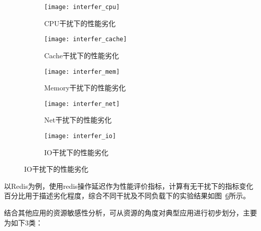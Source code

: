 \begin{figure}[H]
    \centering
    \begin{subfigure}[b]{0.32\textwidth}
        \texttt{[image: interfer\_cpu]}
        \caption{CPU干扰下的性能劣化}
        \label{fig:interfer_cpu}
    \end{subfigure}
    \begin{subfigure}[b]{0.32\textwidth}
      \texttt{[image: interfer\_cache]}
      \caption{Cache干扰下的性能劣化}
      \label{fig:interfer_cache}
    \end{subfigure}
    \begin{subfigure}[b]{0.32\textwidth}
        \texttt{[image: interfer\_mem]}
        \caption{Memory干扰下的性能劣化}
        \label{fig:interfer_mem}
    \end{subfigure}
    \begin{subfigure}[b]{0.32\textwidth}
        \texttt{[image: interfer\_net]}
        \caption{Net干扰下的性能劣化}
        \label{fig:interfer_net}
    \end{subfigure}
    \begin{subfigure}[b]{0.32\textwidth}
        \texttt{[image: interfer\_io]}
        \caption{IO干扰下的性能劣化}
        \label{fig:interfer_io}
    \end{subfigure}

\label{fig:redis_interf_sensitivity}
\end{figure}

以Redis为例，使用redis操作延迟作为性能评价指标，计算有无干扰下的指标变化百分比用于描述劣化程度，综合不同干扰及不同负载下的实验结果如图~\ref{fig:redis_interf_sensitivity}所示。

结合其他应用的资源敏感性分析，可从资源的角度对典型应用进行初步划分，主要为如下3类：

